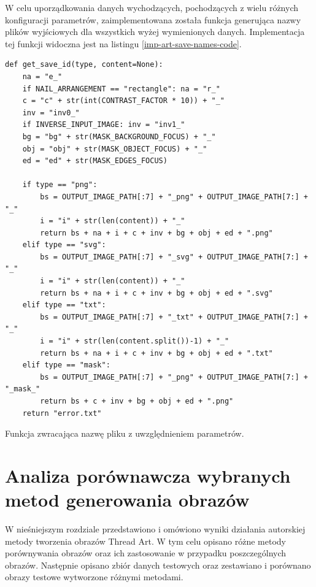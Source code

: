         
        W celu uporządkowania danych wychodzących, pochodzących z wielu różnych konfiguracji parametrów, zaimplementowana została funkcja generująca nazwy plików wyjściowych dla wszystkich wyżej wymienionych danych. Implementacja tej funkcji widoczna jest na listingu \ref{imp-art-save-names-code}.
        \begin{code}[H]
        \begin{verbatim}
def get_save_id(type, content=None):
    na = "e_"
    if NAIL_ARRANGEMENT == "rectangle": na = "r_"
    c = "c" + str(int(CONTRAST_FACTOR * 10)) + "_"
    inv = "inv0_"
    if INVERSE_INPUT_IMAGE: inv = "inv1_"
    bg = "bg" + str(MASK_BACKGROUND_FOCUS) + "_"
    obj = "obj" + str(MASK_OBJECT_FOCUS) + "_"
    ed = "ed" + str(MASK_EDGES_FOCUS)

    if type == "png":
        bs = OUTPUT_IMAGE_PATH[:7] + "_png" + OUTPUT_IMAGE_PATH[7:] + "_"
        i = "i" + str(len(content)) + "_"
        return bs + na + i + c + inv + bg + obj + ed + ".png"
    elif type == "svg":
        bs = OUTPUT_IMAGE_PATH[:7] + "_svg" + OUTPUT_IMAGE_PATH[7:] + "_"
        i = "i" + str(len(content)) + "_"
        return bs + na + i + c + inv + bg + obj + ed + ".svg"
    elif type == "txt":
        bs = OUTPUT_IMAGE_PATH[:7] + "_txt" + OUTPUT_IMAGE_PATH[7:] + "_"
        i = "i" + str(len(content.split())-1) + "_"
        return bs + na + i + c + inv + bg + obj + ed + ".txt"
    elif type == "mask":
        bs = OUTPUT_IMAGE_PATH[:7] + "_png" + OUTPUT_IMAGE_PATH[7:] + "_mask_"
        return bs + c + inv + bg + obj + ed + ".png"
    return "error.txt"
        \end{verbatim}
        \caption{Funkcja zwracająca nazwę pliku z uwzględnieniem parametrów.}
        \label{imp-art-save-names-code}
        \end{code}

\chapter{Analiza porównawcza wybranych metod generowania obrazów} \label{comp}
W nieśniejszym rozdziale przedstawiono i omówiono wyniki działania autorskiej metody tworzenia obrazów Thread Art. W tym celu opisano różne metody porównywania obrazów oraz ich zastosowanie w przypadku poszczególnych obrazów. Następnie opisano zbiór danych testowych oraz zestawiano i porównano obrazy testowe wytworzone różnymi metodami.
